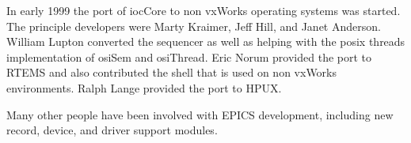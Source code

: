 In early 1999 the port of iocCore to non vxWorks operating systems was started. The principle developers were Marty 
Kraimer, Jeff Hill, and Janet Anderson. William Lupton converted the sequencer as well as helping with the posix threads 
implementation of osiSem and osiThread. Eric Norum provided the port to RTEMS and also contributed the shell that is 
used on non vxWorks environments. Ralph Lange provided the port to HPUX.

Many other people have been involved with EPICS development, including new record, device, and driver support 
modules.








